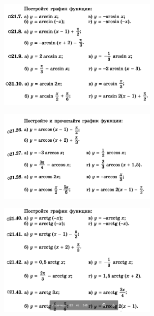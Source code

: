 
\begin{figure}[h!]
	\centering
	\includegraphics[width=0.7\textwidth]{img/arcsin_t1.png}
\end{figure}

\begin{figure}[h!]
	\centering
	\includegraphics[width=0.7\textwidth]{img/arccos_t1.png}
\end{figure}

\begin{figure}[h!]
	\centering
	\includegraphics[width=0.7\textwidth]{img/acctg_t1.png}
\end{figure}